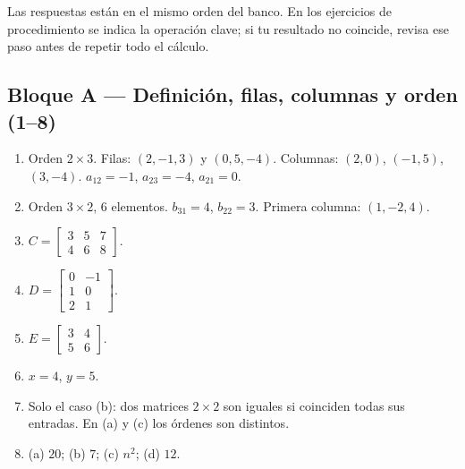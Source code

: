 \documentclass[12pt, letterpaper]{article}
\newcommand{\mwmat}[1]{\ensuremath{\begin{bmatrix}#1\end{bmatrix}}}
\begin{document}
\begin{cuadroinfo}
  \small
  Las respuestas están en el mismo orden del banco. En los ejercicios de
  procedimiento se indica la operación clave; si tu resultado no coincide,
  revisa ese paso antes de repetir todo el cálculo.
\end{cuadroinfo}

\subsection*{Bloque A — Definición, filas, columnas y orden (1--8)}
\begin{enumerate}[label=\textbf{\arabic*.}, start=1, leftmargin=*]
  \item Orden $2\times3$. Filas: $(2,-1,3)$ y $(0,5,-4)$. Columnas:
        $(2,0)$, $(-1,5)$, $(3,-4)$. $a_{12}=-1$, $a_{23}=-4$,
        $a_{21}=0$.
  \item Orden $3\times2$, $6$ elementos. $b_{31}=4$, $b_{22}=3$. Primera
        columna: $(1,-2,4)$.
  \item $C=\mwmat{3&5&7\\4&6&8}$.
  \item $D=\mwmat{0&-1\\1&0\\2&1}$.
  \item $E=\mwmat{3&4\\5&6}$.
  \item $x=4$, $y=5$.
  \item Solo el caso (b): dos matrices $2\times2$ son iguales si coinciden
        todas sus entradas. En (a) y (c) los órdenes son distintos.
  \item (a) $20$; \quad (b) $7$; \quad (c) $n^2$; \quad (d) $12$.
\end{enumerate}
\end{document}
